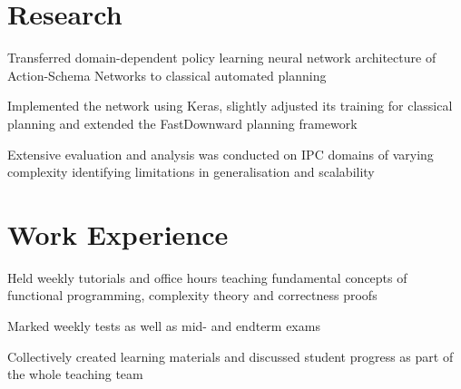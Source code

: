 \documentclass[]{deedy-resume}
\begin{document}
\hfill
\begin{minipage}[t]{0.66\textwidth} 



\section{Research}
\vspace{\topsep} %
\begin{tightemize}
    \item Transferred domain-dependent policy learning neural network architecture of Action-Schema Networks to
    classical automated planning
    \item Implemented the network using Keras, slightly adjusted its training for classical planning and extended 
    the FastDownward planning framework
    \item Extensive evaluation and analysis was conducted on IPC domains of varying complexity identifying
    limitations in generalisation and scalability
\end{tightemize}
\sectionsep



\section{Work Experience}
\begin{tightemize}
    \item Held weekly tutorials and office hours teaching fundamental concepts of functional programming, complexity theory and correctness proofs
    \item Marked weekly tests as well as mid- and endterm exams
    \item Collectively created learning materials and discussed student progress as part of the whole teaching team
\end{tightemize}
\sectionsep



\end{minipage}
\end{document}
